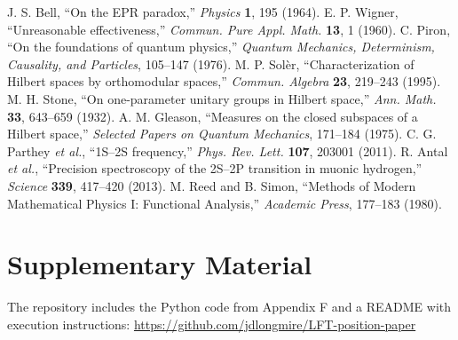 \documentclass[aps,prx,twocolumn]{revtex4-2}
\begin{document}
\begin{thebibliography}{8}
J. S. Bell, ``On the EPR paradox,'' \textit{Physics} \textbf{1}, 195 (1964).
E. P. Wigner, ``Unreasonable effectiveness,'' \textit{Commun. Pure Appl. Math.} \textbf{13}, 1 (1960).
C. Piron, ``On the foundations of quantum physics,'' \textit{Quantum Mechanics, Determinism, Causality, and Particles}, 105--147 (1976).
M. P. Solèr, ``Characterization of Hilbert spaces by orthomodular spaces,'' \textit{Commun. Algebra} \textbf{23}, 219--243 (1995).
M. H. Stone, ``On one-parameter unitary groups in Hilbert space,'' \textit{Ann. Math.} \textbf{33}, 643--659 (1932).
A. M. Gleason, ``Measures on the closed subspaces of a Hilbert space,'' \textit{Selected Papers on Quantum Mechanics}, 171--184 (1975).
C. G. Parthey \textit{et al.}, ``1S--2S frequency,'' \textit{Phys. Rev. Lett.} \textbf{107}, 203001 (2011).
R. Antal \textit{et al.}, ``Precision spectroscopy of the 2S--2P transition in muonic hydrogen,'' \textit{Science} \textbf{339}, 417--420 (2013).
M. Reed and B. Simon, ``Methods of Modern Mathematical Physics I: Functional Analysis,'' \textit{Academic Press}, 177--183 (1980).
\end{thebibliography}

\section*{Supplementary Material}
The repository includes the Python code from Appendix F and a README with execution instructions: \url{https://github.com/jdlongmire/LFT-position-paper}
\end{document}
